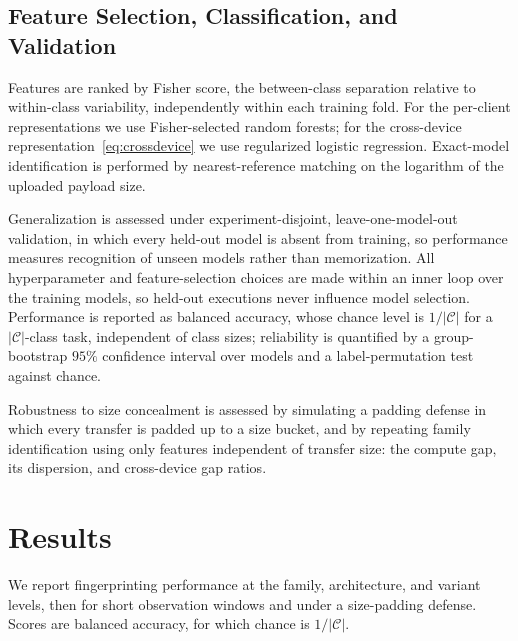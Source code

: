 \documentclass[conference]{IEEEtran}
\begin{document}
\subsection{Feature Selection, Classification, and Validation}
\label{subsec:classification}
Features are ranked by Fisher score, the between-class separation relative to
within-class variability, independently within each training fold. For the per-client representations we use Fisher-selected random
forests; for the cross-device representation~\eqref{eq:crossdevice} we use
regularized logistic regression. Exact-model identification is performed by
nearest-reference matching on the logarithm of the uploaded payload size.

Generalization is assessed under experiment-disjoint, leave-one-model-out
validation, in which every held-out model is absent from training, so
performance measures recognition of unseen models rather than memorization. All
hyperparameter and feature-selection choices are made within an inner loop over
the training models, so held-out executions never influence model selection.
Performance is reported as balanced accuracy, whose chance level is
$1/|\mathcal{C}|$ for a $|\mathcal{C}|$-class task, independent of class sizes;
reliability is quantified by a group-bootstrap $95\%$ confidence interval over
models and a label-permutation test against chance.


Robustness to size concealment is assessed by simulating a padding defense in
which every transfer is padded up to a size bucket, and by repeating family
identification using only features independent of transfer size: the compute
gap, its dispersion, and cross-device gap ratios.

\section{Results}
\label{sec:results}
We report fingerprinting performance at the family, architecture, and variant
levels, then for short observation windows and under a size-padding defense.
Scores are balanced accuracy, for which chance is $1/|\mathcal{C}|$.
\end{document}
